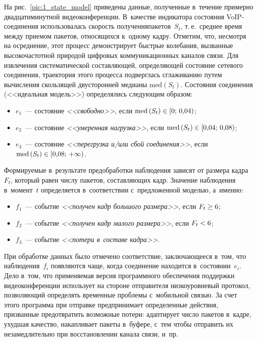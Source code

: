 \begin{multicols}{2}
На рис.~\ref{pic:1_state_model} приведены данные, полученные 
в~те\-чение примерно двадцатиминутной видеоконференции. В~качестве
индикатора состояния VoIP-со\-еди\-не\-ния использовалась скорость
получения\linebreak пакетов~$S_t$, т.\,е.\ среднее время между приемом пакетов,
относящихся к~одному кадру. Отметим, что, несмотря на осреднение,
этот процесс демонстрирует быстрые колебания, вызванные
высоко\-час\-тот\-ной природой цифровых коммуникационных каналов связи.
Для извлечения систематической со\-став\-ля\-ющей, определяющей состояние
сетевого соединения, траектория этого процесса подверглась
сглаживанию путем вычисления скользящей двусторонней медианы
$\mathrm{med}\left(S_t\right)$. Состояния соединения (<<идеальная модель>>)
определялись сле\-ду\-ющим образом:
\begin{itemize}
\item $e_1$~--- состояние {\it<<свободно>>}, если $\mathrm{med}\left(S_t\right)\hm\in [0;\, 0{,}04)$;
\item $e_2$~--- состояние {\it<<умеренная нагрузка>>}, если $\mathrm{med}\left(S_t\right)\hm\in [0{,}04;\, 0{,}08)$;
\item $e_3$~--- состояние {\it<<перегрузка и/или сбой соединения>>}, если $\mathrm{med}\left(S_t\right)\hm\in [0{,}08;\, +\infty)$.
\end{itemize}

Формируемые в~результате предобработки наблюдения зависят от размера
кадра~$F_t$, который равен числу пакетов, составляющих кадр.
Значение наблюдения в~момент~$t$ определяется в~соответствии 
с~предложенной моделью, а~именно:
\begin{itemize}
\item $f_1$~--- событие {\it<<получен кадр большого размера>>}, если $F_t \hm\geq 6$;\\[-8pt]
\item $f_2$~--- событие {\it<<получен кадр малого размера>>}, если $F_t \hm< 6$;\\[-8pt]
\item $f_3$~--- событие {\it<<потери в~составе  кадра>>}.
\end{itemize}


При обработке данных было отмечено соответствие, заключающееся 
в~том, что наблюдения~$f_i$ появляются чаще, когда соединение
находится в~состоянии~$e_i$. Дело в~том, что применяемая версия
программного обеспечения поддержки видеоконференции использует на
стороне отправителя низкоуровневый протокол, позволяющий определять
временные проблемы с~мобильной связью. За счет этого программа при
отправке предпринимает определенные действия, призванные
предотвратить возможные потери: адаптирует число пакетов в~кадре,
ухудшая качество, накапливает пакеты в~буфере, с~тем чтобы отправить
их незамедлительно при восстановлении канала связи, и~пр.



\end{multicols}
